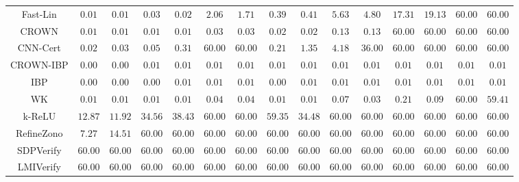 \begin{table*}
{\begin{tabular}{c|c|c|c|c|c|c|c|c|c|c|c|c|c|c}
     Fast-Lin &        $0.01$ &        $0.01$ &        $0.03$ &        $0.02$ &        $2.06$ &        $1.71$ &        $0.39$ &        $0.41$ &        $5.63$ &        $4.80$ &       $17.31$ &       $19.13$ &       $60.00$ &       $60.00$ \\
        CROWN &        $0.01$ &        $0.01$ &        $0.01$ &        $0.01$ &        $0.03$ &        $0.03$ &        $0.02$ &        $0.02$ &        $0.13$ &        $0.13$ &       $60.00$ &       $60.00$ &       $60.00$ &       $60.00$ \\
     CNN-Cert &        $0.02$ &        $0.03$ &        $0.05$ &        $0.31$ &       $60.00$ &       $60.00$ &        $0.21$ &        $1.35$ &        $4.18$ &       $36.00$ &       $60.00$ &       $60.00$ &       $60.00$ &       $60.00$ \\
    CROWN-IBP &        $0.00$ &        $0.00$ &        $0.01$ &        $0.01$ &        $0.01$ &        $0.01$ &        $0.01$ &        $0.01$ &        $0.01$ &        $0.01$ &        $0.01$ &        $0.01$ &        $0.01$ &        $0.01$ \\
          IBP &        $0.00$ &        $0.00$ &        $0.00$ &        $0.01$ &        $0.01$ &        $0.01$ &        $0.00$ &        $0.01$ &        $0.01$ &        $0.01$ &        $0.01$ &        $0.01$ &        $0.01$ &        $0.01$ \\
           WK &        $0.01$ &        $0.01$ &        $0.01$ &        $0.01$ &        $0.04$ &        $0.04$ &        $0.01$ &        $0.01$ &        $0.07$ &        $0.03$ &        $0.21$ &        $0.09$ &       $60.00$ &       $59.41$ \\
       k-ReLU &       $12.87$ &       $11.92$ &       $34.56$ &       $38.43$ &       $60.00$ &       $60.00$ &       $59.35$ &       $34.48$ &       $60.00$ &       $60.00$ &       $60.00$ &       $60.00$ &       $60.00$ &       $60.00$ \\
   RefineZono &        $7.27$ &       $14.51$ &       $60.00$ &       $60.00$ &       $60.00$ &       $60.00$ &       $60.00$ &       $60.00$ &       $60.00$ &       $60.00$ &       $60.00$ &       $60.00$ &       $60.00$ &       $60.00$ \\
    SDPVerify &       $60.00$ &       $60.00$ &       $60.00$ &       $60.00$ &       $60.00$ &       $60.00$ &       $60.00$ &       $60.00$ &       $60.00$ &       $60.00$ &       $60.00$ &       $60.00$ &       $60.00$ &       $60.00$ \\
    LMIVerify &       $60.00$ &       $60.00$ &       $60.00$ &       $60.00$ &       $60.00$ &       $60.00$ &       $60.00$ &       $60.00$ &       $60.00$ &       $60.00$ &       $60.00$ &       $60.00$ &       $60.00$ &       $60.00$ \\

\end{tabular}}
\end{table*}
